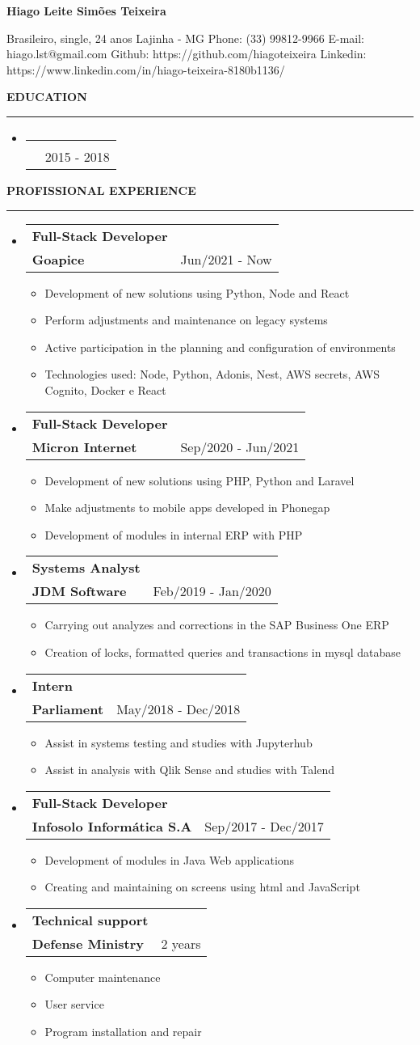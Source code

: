 \documentclass[a4paper,10pt]{article}
\makeatletter
\newcommand{\EducationItem}[3]{
    \item
    \begin{tabular*}{0.93\textwidth}[t]{l@{\extracolsep{\fill}}r}
        \normalfont{#1} & \\
        \small\normalfont{#2} & \scriptsize#3
    \end{tabular*}
}
\newcommand{\WorkExpItem}[3]{
    \item
        \begin{tabular*}{0.93\textwidth}[t]{l@{\extracolsep{\fill}}r}
            \textbf{#1} & \\
            \small\textbf{#2} & \scriptsize#3 \\
        \end{tabular*}
}
\newcommand{\WorkExpActivitiesBegin}[0]{
    \vspace{-5pt}\begin{itemize}
}
\newcommand{\WorkExpActivitiesItem}[1]{
    \vspace{-2pt}\item[]\small #1
}
\newcommand{\WorkExpActivitiesEnd}[0]{
    \end{itemize}\vspace{-7pt}
}
\newcommand{\SectionTitle}[1]{
    \begin{flushleft}
    \textbf{#1}
    \noindent\textcolor{gray}{\rule{18.5cm}{1px}}
    \end{flushleft}
}
\newcommand{\SectionBegin}[0]{
    \vspace{-16pt}\begin{flushleft}
    \begin{itemize}
}
\newcommand{\SectionEnd}[0]{
    \end{itemize}
    \end{flushleft}\vspace{-2pt}
}
\newcommand{\PersonInformation}[7]{
    \begin{flushleft}
        \begin{LARGE}
            \textbf{#1}
        \end{LARGE}
    \end{flushleft}

    \begin{flushleft}
        #2
        \newline
        #3
        \newline
        Phone: #4
        \newline
        E-mail: #5
        \newline
        Github: #6
        \newline
        Linkedin: #7
        \newline
    \end{flushleft}
}
\makeatother
\begin{document}

\PersonInformation
    {Hiago Leite Simões Teixeira}
    {Brasileiro, single, 24 anos}
    {Lajinha - MG}
    {(33) 99812-9966}
    {hiago.lst@gmail.com}
    {https://github.com/hiagoteixeira}
    {https://www.linkedin.com/in/hiago-teixeira-8180b1136/}

\SectionTitle
    {EDUCATION}
\SectionBegin
    \EducationItem
        {Bachelor on Computer science}
        {Centro Universitário de Brasília - UniCEUB}
        {2015 - 2018}
\SectionEnd

\SectionTitle
    { PROFISSIONAL EXPERIENCE}
\SectionBegin
    \WorkExpItem
        {Full-Stack Developer}
        {Goapice}
        {Jun/2021 - Now}
        \WorkExpActivitiesBegin
            \WorkExpActivitiesItem{Development of new solutions using Python, Node and React}
            \WorkExpActivitiesItem{Perform adjustments and maintenance on legacy systems}
            \WorkExpActivitiesItem{Active participation in the planning and configuration of environments}
            \WorkExpActivitiesItem{Technologies used: Node, Python, Adonis, Nest, AWS secrets, AWS Cognito, Docker e React}
        \WorkExpActivitiesEnd

    \WorkExpItem
        {Full-Stack Developer}
        {Micron Internet}
        {Sep/2020 - Jun/2021}
        \WorkExpActivitiesBegin
            \WorkExpActivitiesItem{Development of new solutions using PHP, Python and Laravel}
            \WorkExpActivitiesItem{Make adjustments to mobile apps developed in Phonegap}
            \WorkExpActivitiesItem{Development of modules in internal ERP with PHP}
        \WorkExpActivitiesEnd
    \WorkExpItem
        {Systems Analyst}
        {JDM Software}
        {Feb/2019 - Jan/2020}
        \WorkExpActivitiesBegin
            \WorkExpActivitiesItem{Carrying out analyzes and corrections in the SAP Business One ERP}
            \WorkExpActivitiesItem{Creation of locks, formatted queries and transactions in mysql database}
        \WorkExpActivitiesEnd
    \WorkExpItem
        {Intern}
        {Parliament}
        {May/2018 - Dec/2018}
        \WorkExpActivitiesBegin
            \WorkExpActivitiesItem{Assist in systems testing and studies with Jupyterhub}
            \WorkExpActivitiesItem{Assist in analysis with Qlik Sense and studies with Talend}
        \WorkExpActivitiesEnd
    \WorkExpItem
        {Full-Stack Developer}
        {Infosolo Informática S.A}
        {Sep/2017 - Dec/2017}
        \WorkExpActivitiesBegin
            \WorkExpActivitiesItem{Development of modules in Java Web applications}
            \WorkExpActivitiesItem{Creating and maintaining on screens using html and JavaScript}
        \WorkExpActivitiesEnd
    \WorkExpItem
        {Technical support}
        {Defense Ministry}
        {2 years}
        \WorkExpActivitiesBegin
            \WorkExpActivitiesItem{Computer maintenance}
            \WorkExpActivitiesItem{User service}
            \WorkExpActivitiesItem{Program installation and repair}
        \WorkExpActivitiesEnd
\SectionEnd
\end{document}
